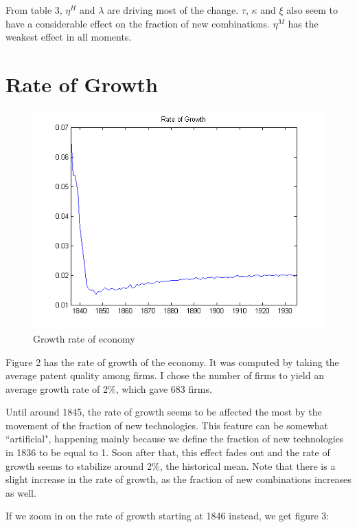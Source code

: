 \documentclass[a4paper,11pt]{article}
\begin{document}
From table 3, $\eta^H$ and $\lambda$ are driving most of the change. $\tau$, $\kappa$ and $\xi$ also seem to have a considerable effect on the fraction of new combinations. $\eta^M$ has the weakest effect in all moments.

\section*{Rate of Growth}

\begin{figure}[h!]
\begin{center}
\includegraphics[scale=.8]{growth.png}
\caption{Growth rate of economy}
\end{center}
\end{figure}

Figure 2 has the rate of growth of the economy. It was computed by taking the average patent quality among firms. I chose the number of firms to yield an average growth rate of 2\%, which gave 683 firms. 

Until around 1845, the rate of growth seems to be affected the most by the movement of the fraction of new technologies. This feature can be somewhat ``artificial", happening mainly because we define the fraction of new technologies in 1836 to be equal to 1. Soon after that, this effect fades out and the rate of growth seems to stabilize around 2\%, the historical mean. Note that there is a slight increase in the rate of growth, as the fraction of new combinations increases as well. 

If we zoom in on the rate of growth starting at 1846 instead, we get figure 3:
\end{document}

